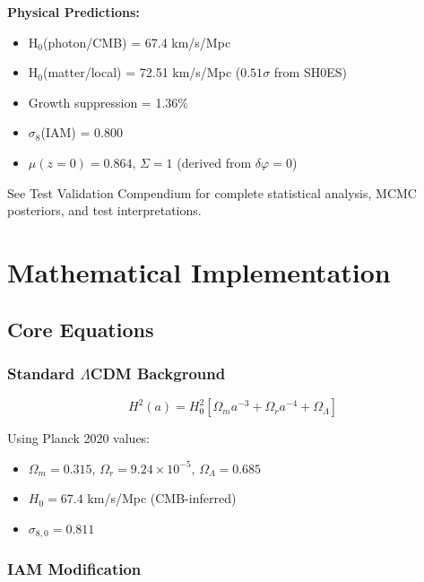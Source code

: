 \documentclass[11pt]{article}
\begin{document}
\textbf{Physical Predictions:}
\begin{itemize}
    \item H$_0$(photon/CMB) = 67.4 km/s/Mpc
    \item H$_0$(matter/local) = 72.51 km/s/Mpc ($0.51\sigma$ from SH0ES)
    \item Growth suppression = 1.36\%
    \item $\sigma_8$(IAM) = 0.800
    \item $\mu(z=0) = 0.864$, $\Sigma = 1$ (derived from $\delta\varphi = 0$)
\end{itemize}

\noindent See Test Validation Compendium for complete statistical analysis, MCMC posteriors, and test interpretations.

\section{Mathematical Implementation}

\subsection{Core Equations}

\subsubsection{Standard $\Lambda$CDM Background}

\begin{equation}
H^2(a) = H_0^2 \left[ \Omega_m a^{-3} + \Omega_r a^{-4} + \Omega_\Lambda \right]
\end{equation}

\noindent Using Planck 2020 values:
\begin{itemize}
    \item $\Omega_m = 0.315$, $\Omega_r = 9.24 \times 10^{-5}$, $\Omega_\Lambda = 0.685$
    \item $H_0 = 67.4$ km/s/Mpc (CMB-inferred)
    \item $\sigma_{8,0} = 0.811$
\end{itemize}

\subsubsection{IAM Modification}
\end{document}
